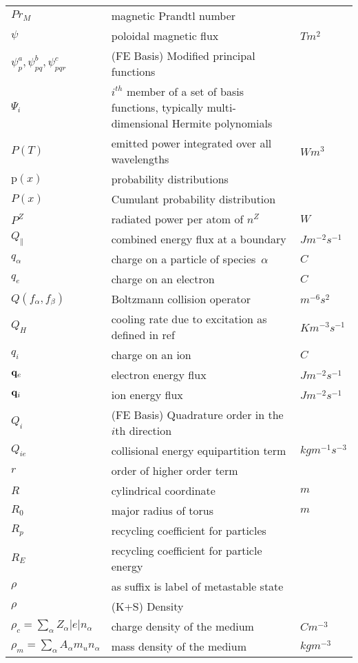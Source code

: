 \begin{longtable}{|p{3.0cm}|p{10.0cm}|p{3.0cm}|}
$Pr_M$ & magnetic Prandtl number & \\
$\psi$ & poloidal magnetic flux  & $T m^2$ \\
$\psi^a_p, \psi^b_{pq}, \psi^c_{pqr}$ &  (FE Basis) Modified principal functions & \\
$\Psi_i$ & $i^{th}$ member of a set of basis functions, typically multi-dimensional Hermite polynomials & \\
$P(T)$ & emitted power integrated over all wavelengths  & $W m^3$ \\
$\mathrm{p}(x)$ & probability distributions    & \\
$P(x)$ & Cumulant probability distribution  & \\
$P^Z$ & radiated power per atom of $n^Z$  & $W$ \\
$Q_\|$ & combined energy flux at a boundary  & $J m^{-2} s^{-1}$ \\
$q_\alpha$ & charge on a particle of species~$\alpha$ & $C$ \\
$q_e$ & charge on an electron & $C$ \\
$Q(f_\alpha, f_\beta)$ & Boltzmann collision operator  & $m^{-6} s^2$ \\
$Q_H$ & cooling rate due to excitation as defined in ref~\cite{Ha13Benc}  & $K m^{-3} s^{-1}$ \\
$q_i$ & charge on an ion  & $C$ \\
${\bf q}_e$ & electron energy flux  & $J m^{-2} s^{-1}$ \\
${\bf q}_i$ & ion energy flux  & $J m^{-2} s^{-1}$ \\
$Q_i$ &  (FE Basis) Quadrature order in the $i$th direction & \\
$Q_{ie}$ & collisional energy equipartition term  & $kg m^{-1} s^{-3}$ \\
$r$ & order of higher order term  & \\
$R$ & cylindrical coordinate  & $m$ \\
$R_0$ & major radius of torus & $m$ \\
$R_p$ & recycling coefficient for particles & \\
$R_E$ & recycling coefficient for particle energy & \\
$\rho$ & as suffix is label of metastable state & \\
$\rho$ &  (K+S) Density & \\
$\rho_c=\sum_\alpha Z_\alpha |e| n_\alpha$ & charge density of the medium  & $C m^{-3}$ \\
$\rho_m=\sum_\alpha A_\alpha m_u n_\alpha$ & mass density of the medium  & $kg m^{-3}$ \\

\end{longtable}
